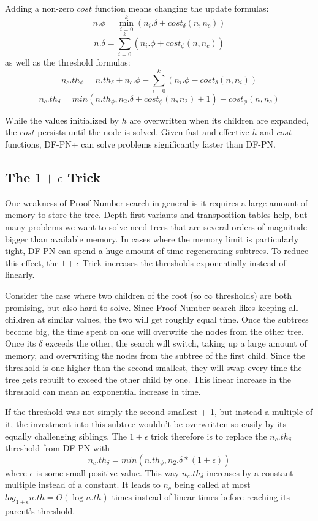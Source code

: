 Adding a non-zero $cost$ function means changing the update formulas: $$ n.\phi = \displaystyle\min\limits_{i=0}^k (n_i.\delta + cost_\delta(n, n_c))$$ $$n.\delta = \displaystyle\sum\limits_{i=0}^k (n_i.\phi + cost_\phi(n, n_c))$$ as well as the threshold formulas:
$$n_c.th_\phi = n.th_\delta + n_c.\phi - \displaystyle\sum\limits_{i=0}^k (n_i.\phi - cost_\delta(n, n_i))$$ $$n_c.th_\delta = min(n.th_\phi, n_2.\delta + cost_\phi(n, n_2) + 1) - cost_\phi(n, n_c)$$

While the values initialized by $h$ are overwritten when its children are expanded, the $cost$ persists until the node is solved. Given fast and effective $h$ and $cost$ functions, DF-PN+ can solve problems significantly faster than DF-PN.

\subsection{The $1+\epsilon$ Trick} \label{sec:epstrick}

One weakness of Proof Number search in general is it requires a large amount of memory to store the tree. Depth first variants and transposition tables help, but many problems we want to solve need trees that are several orders of magnitude bigger than available memory. In cases where the memory limit is particularly tight, DF-PN can spend a huge amount of time regenerating subtrees. To reduce this effect, the $1+\epsilon$ Trick \cite{pawlewicz2007epsilon} increases the thresholds exponentially instead of linearly.

Consider the case where two children of the root (so $\infty$ thresholds) are both promising, but also hard to solve. Since Proof Number search likes keeping all children at similar values, the two will get roughly equal time. Once the subtrees become big, the time spent on one will overwrite the nodes from the other tree. Once its $\delta$ exceeds the other, the search will switch, taking up a large amount of memory, and overwriting the nodes from the subtree of the first child. Since the threshold is one higher than the second smallest, they will swap every time the tree gets rebuilt to exceed the other child by one. This linear increase in the threshold can mean an exponential increase in time.

If the threshold was not simply the second smallest + 1, but instead a multiple of it, the investment into this subtree wouldn't be overwritten so easily by its equally challenging siblings. The $1 + \epsilon$ trick therefore is to replace the $n_c.th_\delta$ threshold from DF-PN with $$n_c.th_\delta = min(n.th_\phi, n_2.\delta*(1 + \epsilon))$$ where $\epsilon$ is some small positive value. This way $n_c.th_\delta$ increases by a constant multiple instead of a constant. It leads to $n_c$ being called at most $log_{1+\epsilon}n.th = O(\log n.th)$ times instead of linear times before reaching its parent's threshold.

